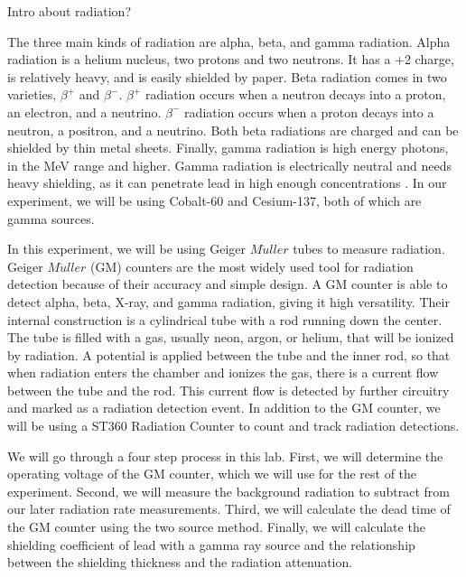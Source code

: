 \par Intro about radiation? 
\par The three main kinds of radiation are alpha, beta, and gamma radiation. Alpha radiation is a helium nucleus, two protons and two neutrons. It has a +2 charge, is relatively heavy, and is easily shielded by paper. Beta radiation comes in two varieties, $\beta^+$ and $\beta^-$. $\beta^+$ radiation occurs when a neutron decays into a proton, an electron, and a neutrino. $\beta^-$ radiation occurs when a proton decays into a neutron, a positron, and a neutrino. Both beta radiations are charged and can be shielded by thin metal sheets. Finally, gamma radiation is high energy photons, in the MeV range and higher. Gamma radiation is electrically neutral and needs heavy shielding, as it can penetrate lead in high enough concentrations \cite{Radiation Source}. In our experiment, we will be using Cobalt-60 and Cesium-137, both of which are gamma sources.

\par In this experiment, we will be using Geiger $M\ddot{u}ller$ tubes to measure radiation. Geiger $M\ddot{u}ller$ (GM) counters are the most widely used tool for radiation detection because of their accuracy and simple design. A GM counter is able to detect alpha, beta, X-ray, and gamma radiation, giving it high versatility. Their internal construction is a cylindrical tube with a rod running down the center. The tube is filled with a gas, usually neon, argon, or helium, that will be ionized by radiation. A potential is applied between the tube and the inner rod, so that when radiation enters the chamber and ionizes the gas, there is a current flow between the tube and the rod. This current flow is detected by further circuitry and marked as a radiation detection event.\cite{Centric} In addition to the GM counter, we will be using a ST360 Radiation Counter to count and track radiation detections. 

\par We will go through a four step process in this lab. First, we will determine the operating voltage of the GM counter, which we will use for the rest of the experiment. Second, we will measure the background radiation to subtract from our later radiation rate measurements. Third, we will calculate the dead time of the GM counter using the two source method. Finally, we will calculate the shielding coefficient of lead with a gamma ray source and the relationship between the shielding thickness and the radiation attenuation.

